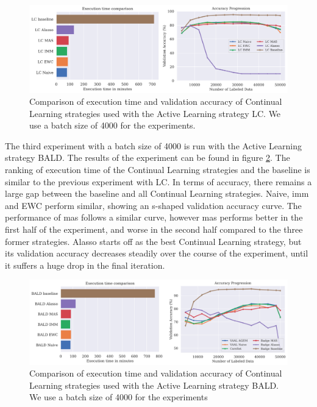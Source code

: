 \begin{figure}[h]
    \centering
    \includegraphics[width=\linewidth]{images/results_CAL/LC_CAL_4000b.png}
    \caption[Continual Active Learning LC 4000 batch size]{Comparison of execution time and validation accuracy of Continual Learning strategies used with the Active Learning strategy
    LC. We use a batch size of 4000 for the experiments. }
    \label{fig:Evaluation:Results:CAL:LC4000}
\end{figure}

The third experiment with a batch size of 4000 is run with the Active Learning strategy BALD. The results of the experiment can be found in figure \ref{fig:Evaluation:Results:CAL:BALD4000}. The ranking of execution time of the Continual
Learning strategies and the baseline is similar to the previous experiment with LC. In terms of accuracy, there remains a large gap between the baseline and all Continual Learning strategies. Naive, \gls{imm} and EWC perform similar, showing an
s-shaped validation accuracy curve. The performance of \gls{mas} follows a similar curve, however \gls{mas} performs better in the first half of the experiment, and worse in the second half compared to the three former strategies. Alasso starts off as
the best Continual Learning strategy, but its validation accuracy decreases steadily over the course of the experiment, until it suffers a huge drop in the final iteration. \par 

\begin{figure}[h]
    \centering
    \includegraphics[width=\linewidth]{images/results_CAL/Bald_CAL_4000b.png}
    \caption[Continual Active Learning BALD 4000 batch size]{Comparison of execution time and validation accuracy of Continual Learning strategies used with the Active Learning strategy
    BALD. We use a batch size of 4000 for the experiments }
    \label{fig:Evaluation:Results:CAL:BALD4000}
\end{figure}


